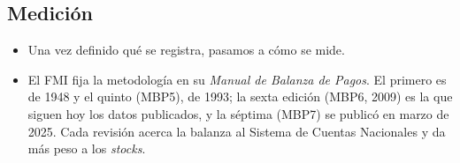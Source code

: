 \documentclass[11pt]{article}
\begin{document}
\subsection{Medición}\label{sec:medicion}

\begin{itemize}
\item Una vez definido qué se registra, pasamos a cómo se mide.
\item El FMI fija la metodología en su \emph{Manual de Balanza de Pagos}. El primero es de 1948 y el quinto (MBP5), de 1993; la sexta edición (MBP6, 2009) es la que siguen hoy los datos publicados, y la séptima (MBP7) se publicó en marzo de 2025\nocite{FMI2009MBP6,FMI2025MBP7}. Cada revisión acerca la balanza al Sistema de Cuentas Nacionales y da más peso a los \emph{stocks}.
\end{itemize}
\end{document}
